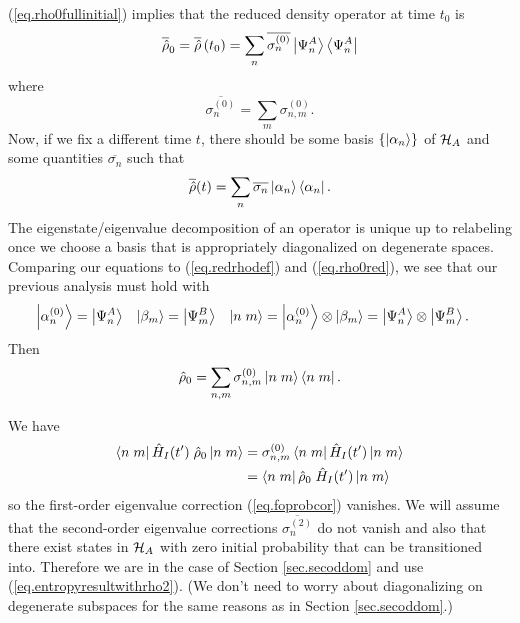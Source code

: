 (\ref{eq.rho0fullinitial}) implies that the reduced density operator at time \(t_0\) is
\[
\overline{\hat{\rho}}_0 = \overline{\hat{\rho}}\left(t_0\right) = \sum_n \overline{\sigma_{n}^{(0)}} \left|\Psi_n^{A}\right\rangle\left\langle\Psi_n^{A}\right|
\]
where
\[
\overline{\sigma_n^{(0)}} = \sum_m \sigma_{n,m}^{(0)}.
\]
Now, if we fix a different time \(t\), there should be some basis \(\{\left|\alpha_n\right\rangle\}\) of \(\mathcal{H}_A\) and some quantities \(\overline{\sigma_n}\) such that
\[
\overline{\hat{\rho}}(t) = \sum_n \overline{\sigma_n} \left|\alpha_n\right\rangle\left\langle\alpha_n\right|.
\]
The eigenstate/eigenvalue decomposition of an operator is unique up to relabeling once we choose a basis that is appropriately diagonalized on degenerate spaces.
Comparing our equations to (\ref{eq.redrhodef}) and (\ref{eq.rho0red}), we see that our previous analysis must hold with
\begin{align*}
\left|\alpha_n^{(0)}\right\rangle &= \left|\Psi_n^A\right\rangle &
\left|\beta_m\right\rangle &= \left|\Psi_m^B\right\rangle & 
\left|n\;m\right\rangle &= \left|\alpha_n^{(0)}\right\rangle \otimes \left|\beta_m\right\rangle = \left|\Psi_n^A\right\rangle\otimes \left|\Psi_m^B\right\rangle.
\end{align*}
Then
\begin{equation}
\label{eq.rho0full}
\hat{\rho}_0 = \sum_{n,m} \sigma_{n,m}^{(0)} \left|n\;m\right\rangle\left\langle n\;m\right|.
\end{equation}

We have
\begin{align*}
\left\langle n\;m\right| \hat{H}_I(t^\prime) \;\hat{\rho}_0 \left|n\;m\right\rangle 
&= 
\sigma_{n,m}^{(0)} \left\langle n\;m\right| \hat{H}_I(t^\prime) \left|n\;m\right\rangle 
\\&=
 \left\langle n\;m\right| \hat{\rho}_0 \;\hat{H}_I(t^\prime) \left|n\;m\right\rangle 
\end{align*}
so the first-order eigenvalue correction (\ref{eq.foprobcor}) vanishes. We will assume that the second-order eigenvalue corrections \(\overline{\sigma_n^{(2)}}\) do not vanish and also that there exist states in \(\mathcal{H}_A\) with zero initial probability that can be transitioned into. Therefore we are in the case of Section \ref{sec.secoddom} and use (\ref{eq.entropyresultwithrho2}). (We don't need to worry about diagonalizing on degenerate subspaces for the same reasons as in Section \ref{sec.secoddom}.)

